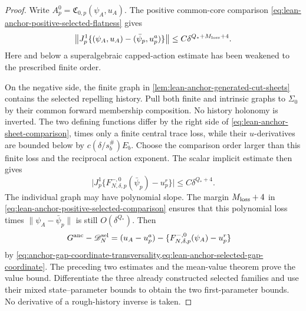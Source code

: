 \begin{proof}
Write \(A^0_p=\mathfrak C_{0,p}(\psi_A,u_A)\).  The positive common-core
comparison \cref{eq:lean-anchor-positive-selected-flatness} gives
\begin{equation}
 \bigl\|J_p^1\{(\psi_A,u_A)-(\bar\psi_p,u^a_p)\}\bigr\|
 \le C\delta^{Q_*+M_{\rm loss}+4}.
 \label{eq:lean-anchor-positive-selected-comparison}
\end{equation}
Here and below a superalgebraic capped-action estimate has been weakened to
the prescribed finite order.

On the negative side, the finite graph in
\cref{lem:lean-anchor-generated-cut-sheets} contains the selected repelling
history.  Pull both finite and intrinsic graphs to \(\Sigma_0\) by their
common forward membership composition.  No history holonomy is inverted.
The two defining functions differ by the right side of
\cref{eq:lean-anchor-sheet-comparison}, times only a finite central trace
loss, while their \(u\)-derivatives are bounded below by
\(c(\delta/s_b^\#)E_b\).  Choose the comparison order larger than this
finite loss and the reciprocal action exponent.  The scalar implicit
estimate then gives
 \begin{equation}
 \bigl|J_p^1\{F_{N,\delta,p}^{-,0}(\bar\psi_p)-u^r_p\}\bigr|
 \le C\delta^{Q_*+4}.
 \label{eq:lean-anchor-negative-selected-comparison}
 \end{equation}
The individual graph may have polynomial slope.  The margin
\(M_{\rm loss}+4\) in
\cref{eq:lean-anchor-positive-selected-comparison} ensures that this
polynomial loss times \(\|\psi_A-\bar\psi_p\|\) is still
\(O(\delta^{Q_*})\).  Then
\begin{align*}
 G^{\rm anc}-\mathscr D_N^{\rm sel}
  &=(u_A-u^a_p)
    -\{F_{N,\delta,p}^{-,0}(\psi_A)-u^r_p\}
\end{align*}
by \cref{eq:anchor-gap-coordinate-transversality,eq:lean-anchor-selected-gap-coordinate}.
The preceding two estimates and the mean-value theorem prove the value
bound.  Differentiate the three already constructed selected families and
use their mixed state--parameter bounds to obtain the two first-parameter
bounds.  No derivative of a rough-history inverse is taken.
\end{proof}

